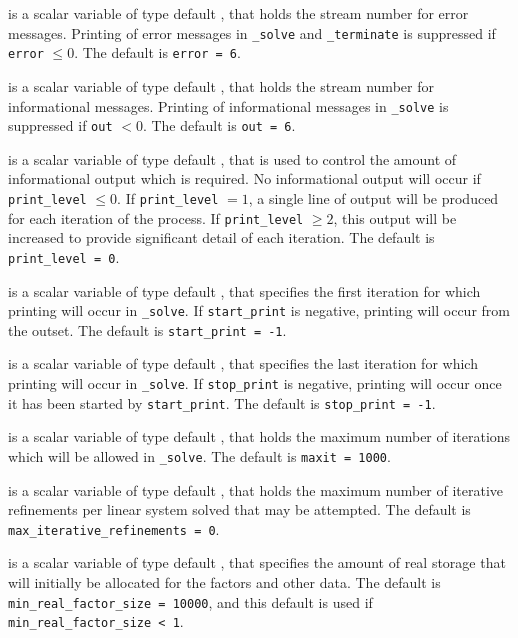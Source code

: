 \begin{description}

 is a scalar variable of type default \integer, that holds the
stream number for error messages. Printing of error messages in
{\tt \packagename\_solve} and {\tt \packagename\_terminate} is suppressed if
{\tt error} $\leq 0$.
The default is {\tt error = 6}.

 is a scalar variable of type default \integer, that holds the
stream number for informational messages. Printing of informational messages in
{\tt \packagename\_solve} is suppressed if {\tt out} $< 0$.
The default is {\tt out = 6}.

 is a scalar variable of type default \integer, that is used
to control the amount of informational output which is required. No
informational output will occur if {\tt print\_level} $\leq 0$. If
{\tt print\_level} $= 1$, a single line of output will be produced for each
iteration of the process. If {\tt print\_level} $\geq 2$, this output will be
increased to provide significant detail of each iteration.
The default is {\tt print\_level = 0}.

 is a scalar variable of type default \integer, that specifies
the first iteration for which printing will occur in {\tt \packagename\_solve}.
If {\tt start\_print} is negative, printing will occur from the outset.
The default is {\tt start\_print = -1}.

 is a scalar variable of type default \integer, that specifies
the last iteration for which printing will occur in  {\tt \packagename\_solve}.
If {\tt stop\_print} is negative, printing will occur once it has been
started by {\tt start\_print}.
The default is {\tt stop\_print = -1}.

 is a scalar variable of type default \integer, that holds the
maximum number of iterations which will be allowed in {\tt \packagename\_solve}.
The default is {\tt maxit = 1000}.

 is a scalar variable of type default
\integer, that holds
the maximum number of iterative refinements per linear system solved
that may be attempted.
The default is {\tt max\_iterative\_refinements = 0}.

 is a scalar variable of type default \integer,
that specifies the amount of real storage that will initially be
allocated for the factors and other data.
The default is {\tt min\_real\_factor\_size = 10000},
and this default is used if {\tt min\_real\_factor\_size < 1}.


\end{description}
